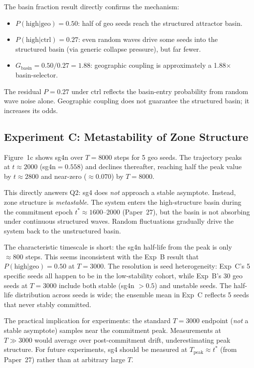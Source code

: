 \documentclass[11pt]{article}
\begin{document}
The basin fraction result directly confirms the mechanism:
\begin{itemize}
  \item $P(\mathrm{high}|\mathrm{geo}) = 0.50$: half of geo seeds reach
        the structured attractor basin.
  \item $P(\mathrm{high}|\mathrm{ctrl}) = 0.27$: even random waves drive
        some seeds into the structured basin (via generic collapse pressure),
        but far fewer.
  \item $G_\mathrm{basin} = 0.50/0.27 = 1.88$: geographic coupling is
        approximately a 1.88$\times$ basin-selector.
\end{itemize}
The residual $P=0.27$ under ctrl reflects the basin-entry probability
from random wave noise alone.
Geographic coupling does not guarantee the structured basin;
it increases its odds.

\subsection{Experiment C: Metastability of Zone Structure}

Figure~1c shows sg4n over $T=8000$ steps for 5 geo seeds.
The trajectory peaks at $t\approx 2000$ (sg4n$=0.558$) and declines
thereafter, reaching half the peak value by $t\approx 2800$ and
near-zero ($\approx 0.070$) by $T=8000$.

This directly answers Q2: sg4 does \emph{not} approach a stable asymptote.
Instead, zone structure is \emph{metastable}.
The system enters the high-structure basin during the commitment epoch
$t^* \approx 1600$--2000 (Paper~27), but the basin is not absorbing under
continuous structured waves.
Random fluctuations gradually drive the system back to the unstructured
basin.

The characteristic timescale is short: the sg4n half-life from the peak
is only $\approx 800$ steps.
This seems inconsistent with the Exp~B result that $P(\mathrm{high}|\mathrm{geo}) = 0.50$
at $T=3000$.
The resolution is seed heterogeneity: Exp~C's 5 specific seeds all happen
to be in the low-stability cohort, while Exp~B's 30 geo seeds at $T=3000$
include both stable (sg4n $>0.5$) and unstable seeds.
The half-life distribution across seeds is wide; the ensemble mean in
Exp~C reflects 5 seeds that never stably committed.

The practical implication for experiments: the standard $T=3000$ endpoint
(\emph{not} a stable asymptote) samples near the commitment peak.
Measurements at $T\gg 3000$ would average over post-commitment drift,
underestimating peak structure.
For future experiments, sg4 should be measured at $T_\mathrm{peak} \approx t^*$
(from Paper~27) rather than at arbitrary large $T$.
\end{document}

